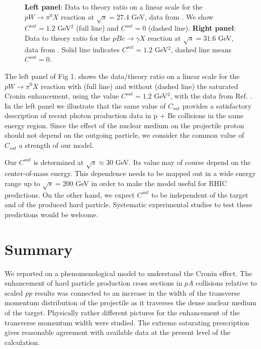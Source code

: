 \begin{figure}[tbp]
\centerline{\textwidth {}}
\caption{\small {\bf Left panel}: Data to theory ratio on a linear scale for the 
$pW \rightarrow \pi^0 X$ reaction at $\sqrt{s}=27.4$ GeV, data from
\cite{antreasyan79}. We show $C^{sat}=1.2$ GeV$^2$ (full line) and
$C^{sat}=0$ (dashed line).
{\bf Right panel}: Data to theory ratio for the 
$pBe \rightarrow \gamma X$ reaction at $\sqrt{s}=31.6$ GeV, data from 
\cite{apanasevich98}.
Solid line indicates $C^{sat}=1.2$ GeV$^2$, dashed line means $C^{sat}=0$.
}
\label{fig-rat}
\end{figure}
 
The left panel of Fig 1. shows the data/theory ratio on a linear scale for the
$pW \rightarrow \pi^0 X$ reaction with (full line) and without (dashed line) the 
saturated Cronin enhancement, using the value $C^{sat}=1.2$ GeV$^2$, with the
data from Ref. \cite{antreasyan79}.  
In the left panel we illustrate that the same value of $C_{sat}$
provides a satisfactory description of recent photon production data 
in p + Be collisions in the same energy region\cite{apanasevich98}.
Since the effect of the nuclear medium on the projectile proton should not 
depend on the outgoing particle, we consider the common value of $C_{sat}$
a strength of our model. 

Our $C^{sat}$ is determined at $\sqrt{s} \approx 30$ GeV. Its value may
of course depend on the center-of-mass energy. This dependence needs to 
be mapped out in a wide energy range up to $\sqrt{s}=200$ GeV in order 
to make the model useful for RHIC predictions. On the other hand, 
we expect $C^{sat}$ to be independent of the target and of the produced hard 
particle. Systematic experimental studies to test these predictions
would be welcome.

\section{Summary}

We reported on a phenomenological model to understand the Cronin effect.
The enhancement of hard particle production cross sections in $pA$ 
collisions relative to scaled $pp$ results was connected to an
increase in the width of the transverse momentum distribution of 
the projectile as it traverses the dense nuclear medium of the target.
Physically rather different pictures for the enhancement of the transverse 
momentum width were studied. The extreme saturating prescription gives 
reasonable agreement with available data at the present level of the
calculation. 

